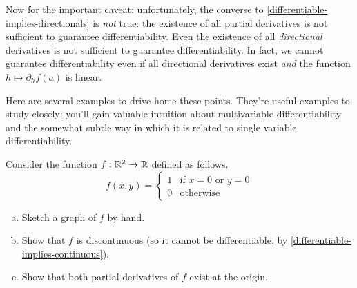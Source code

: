 Now for the important caveat: unfortunately, the converse to \cref{differentiable-implies-directionals} is \emph{not} true: the existence of all partial derivatives is not sufficient to guarantee differentiability. Even the existence of all \emph{directional} derivatives is not sufficient to guarantee differentiability. In fact, we cannot guarantee differentiability even if all directional derivatives exist \emph{and} the function $h \mapsto \partial_h f(a)$ is linear. 

Here are several examples to drive home these points. They're useful examples to study closely; you'll gain valuable intuition about multivariable differentiability and the somewhat subtle way in which it is related to single variable differentiability. 

\begin{exercise}
	Consider the function $f : \mathbb{R}^2 \to \mathbb{R}$ defined as follows. 
	\[ f(x, y) = \begin{cases} 1 &  \text{if } x = 0 \text{ or } y = 0 \\ 0 & \text{otherwise} \end{cases} \]
	\begin{enumerate}[(a)]
		\item Sketch a graph of $f$ by hand. 
		\item Show that $f$ is discontinuous (so it cannot be differentiable, by \cref{differentiable-implies-continuous}). 
		\item Show that both partial derivatives of $f$ exist at the origin. 
	\end{enumerate}
\end{exercise}

